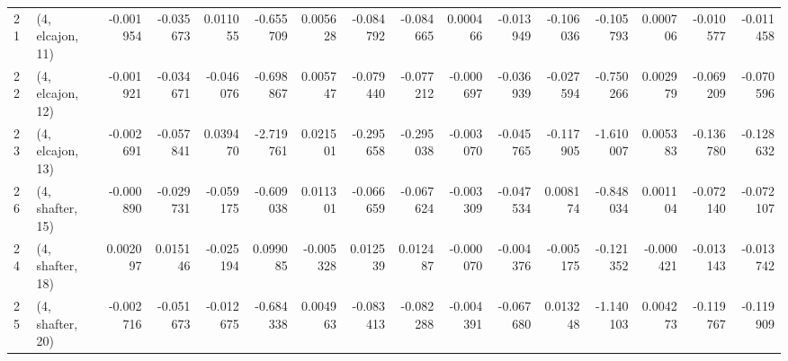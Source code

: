 \begin{tabular}{llrrrrrrrrrrrrrr}
21 &  (4, elcajon, 11) &  -0.001954 & -0.035673 &  0.011055 &  -0.655709 &  0.005628 &  -0.084792 & -0.084665 &  0.000466 & -0.013949 & -0.106036 &  -0.105793 &  0.000706 & -0.010577 & -0.011458 \\
22 &  (4, elcajon, 12) &  -0.001921 & -0.034671 & -0.046076 &  -0.698867 &  0.005747 &  -0.079440 & -0.077212 & -0.000697 & -0.036939 & -0.027594 &  -0.750266 &  0.002979 & -0.069209 & -0.070596 \\
23 &  (4, elcajon, 13) &  -0.002691 & -0.057841 &  0.039470 &  -2.719761 &  0.021501 &  -0.295658 & -0.295038 & -0.003070 & -0.045765 & -0.117905 &  -1.610007 &  0.005383 & -0.136780 & -0.128632 \\
26 &  (4, shafter, 15) &  -0.000890 & -0.029731 & -0.059175 &  -0.609038 &  0.011301 &  -0.066659 & -0.067624 & -0.003309 & -0.047534 &  0.008174 &  -0.848034 &  0.001104 & -0.072140 & -0.072107 \\
24 &  (4, shafter, 18) &   0.002097 &  0.015146 & -0.025194 &   0.099085 & -0.005328 &   0.012539 &  0.012487 & -0.000070 & -0.004376 & -0.005175 &  -0.121352 & -0.000421 & -0.013143 & -0.013742 \\
25 &  (4, shafter, 20) &  -0.002716 & -0.051673 & -0.012675 &  -0.684338 &  0.004963 &  -0.083413 & -0.082288 & -0.004391 & -0.067680 &  0.013248 &  -1.140103 &  0.004273 & -0.119767 & -0.119909 \\
\bottomrule
\end{tabular}
